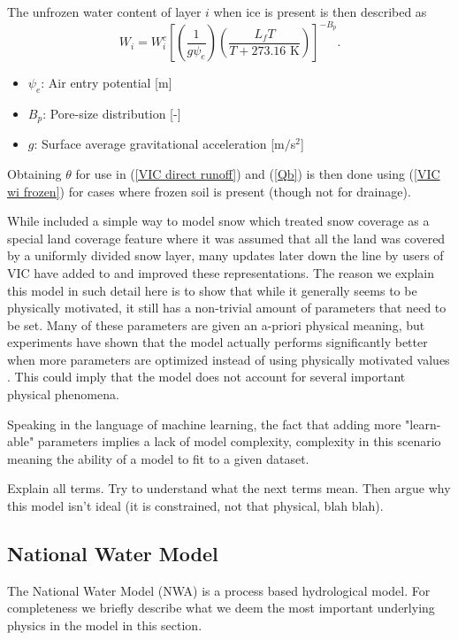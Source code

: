 The unfrozen  water content of layer $i$ when ice is present is then described as 
\begin{equation}
    W_i = W_i^c \left[ \left( \frac{1}{g \psi_e} \right) \left( \frac{L_fT}{T+273.16
    \text{ K}}  \right) \right]^{-B_p}. \label{VIC wi frozen}
\end{equation}

\begin{itemize}
    \item $\psi_e$: Air entry potential [m]
    \item $B_p$: Pore-size distribution [-]
    \item $g$: Surface average gravitational acceleration [m$/$s$^2$]
\end{itemize}
Obtaining $\theta$ for use in (\ref{VIC direct runoff}) and (\ref{Qb}) is then done 
using (\ref{VIC wi frozen}) for cases where frozen soil is present (though not for 
drainage). 

While \citet{VIC} included a simple way to model snow which treated snow coverage as 
a special land coverage feature where it was assumed that all the land was covered 
by a uniformly divided snow layer, many updates later down the line by users of VIC 
have added to and improved these representations. 
The reason we explain this model in such detail here is to show that while it 
generally seems to be physically motivated, it still has a non-trivial amount of 
parameters that need to be set. Many of these parameters are given an a-priori 
physical meaning, but experiments have shown that the model actually performs 
significantly better when more parameters are optimized instead of using physically 
motivated values \citep{VICbench}. This could imply that the model does not account 
for several important physical phenomena.

Speaking in the language of machine learning, the fact that adding more "learn-able" 
parameters implies a lack of model complexity, complexity in this scenario 
meaning the ability of a model to fit to a given dataset.

Explain all terms. Try to understand what the next terms mean. Then argue why 
this model isn't ideal (it is constrained, not that physical, blah blah).
\subsection{National Water Model}
\label{NWM}
The National Water Model (NWA) is a process based hydrological model. For completeness 
we briefly describe what we deem the most important underlying physics in the model 
in this section.


